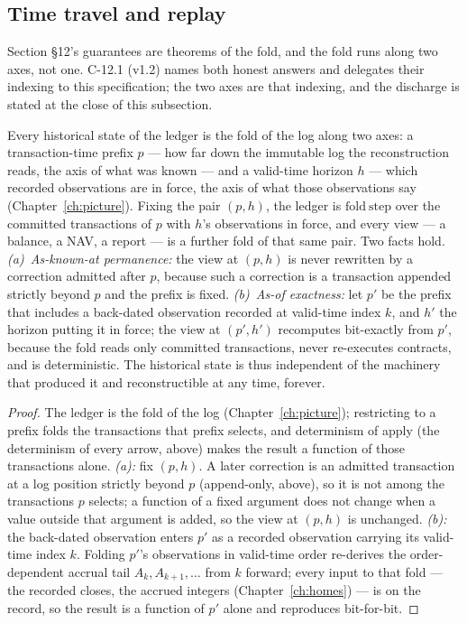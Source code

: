 \subsection{Time travel and replay}

Section \S 12's guarantees are theorems of the fold, and the fold runs along two axes, not
one. C-12.1 (v1.2) names both honest answers and delegates their indexing to this
specification; the two axes are that indexing, and the discharge is stated at the close of
this subsection.

\begin{theorem}\label{thm:timetravel}
Every historical state of the ledger is the fold of the log along two axes: a
transaction-time prefix $p$ --- how far down the immutable log the reconstruction reads,
the axis of what was known --- and a valid-time horizon $h$ --- which recorded observations
are in force, the axis of what those observations say (Chapter~\ref{ch:picture}). Fixing
the pair $(p,h)$, the ledger is $\mathrm{fold\ step}$ over the committed transactions of
$p$ with $h$'s observations in force, and every view --- a balance, a NAV, a report --- is
a further fold of that same pair. Two facts hold.
\emph{(a)~As-known-at permanence:} the view at $(p,h)$ is never rewritten by a correction
admitted after $p$, because such a correction is a transaction appended strictly beyond $p$
and the prefix is fixed.
\emph{(b)~As-of exactness:} let $p'$ be the prefix that includes a back-dated observation
recorded at valid-time index $k$, and $h'$ the horizon putting it in force; the view at
$(p',h')$ recomputes bit-exactly from $p'$, because the fold reads only committed
transactions, never re-executes contracts, and is deterministic. The historical state is
thus independent of the machinery that produced it and reconstructible at any time, forever.
\end{theorem}

\begin{proof}
The ledger is the fold of the log (Chapter~\ref{ch:picture}); restricting to a prefix folds
the transactions that prefix selects, and determinism of apply (the determinism of every
arrow, above) makes the result a function of those transactions alone. \emph{(a):} fix
$(p,h)$. A later correction is an admitted transaction at a log position strictly beyond $p$
(append-only, above), so it is not among the transactions $p$ selects; a function of a fixed
argument does not change when a value outside that argument is added, so the view at $(p,h)$
is unchanged. \emph{(b):} the back-dated observation enters $p'$ as a recorded observation
carrying its valid-time index $k$. Folding $p'$'s observations in valid-time order re-derives
the order-dependent accrual tail $A_k, A_{k+1}, \dots$ from $k$ forward; every input to that
fold --- the recorded closes, the accrued integers (Chapter~\ref{ch:homes}) --- is on the
record, so the result is a function of $p'$ alone and reproduces bit-for-bit.
\end{proof}

